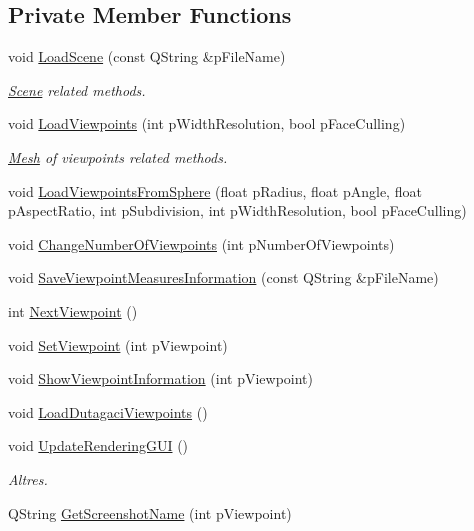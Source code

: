 \subsection*{Private Member Functions}
\begin{DoxyCompactItemize}
\item 
void \hyperlink{class_main_module_controller_a3df04dcc50ced684b43775eaf33cca4b}{Load\+Scene} (const Q\+String \&p\+File\+Name)
\begin{DoxyCompactList}\small\item\em \hyperlink{class_scene}{Scene} related methods. \end{DoxyCompactList}\item 
void \hyperlink{class_main_module_controller_aee272f3f6b07c5e42935cc9ab7dffaf4}{Load\+Viewpoints} (int p\+Width\+Resolution, bool p\+Face\+Culling)
\begin{DoxyCompactList}\small\item\em \hyperlink{class_mesh}{Mesh} of viewpoints related methods. \end{DoxyCompactList}\item 
void \hyperlink{class_main_module_controller_abab94220077c2502af1f7dd69ed3b641}{Load\+Viewpoints\+From\+Sphere} (float p\+Radius, float p\+Angle, float p\+Aspect\+Ratio, int p\+Subdivision, int p\+Width\+Resolution, bool p\+Face\+Culling)
\item 
void \hyperlink{class_main_module_controller_aa4f80f92133577a82b995ce70daa6dbb}{Change\+Number\+Of\+Viewpoints} (int p\+Number\+Of\+Viewpoints)
\item 
void \hyperlink{class_main_module_controller_a7cad7f8f7907c68a61b879df31aba82a}{Save\+Viewpoint\+Measures\+Information} (const Q\+String \&p\+File\+Name)
\item 
int \hyperlink{class_main_module_controller_ad49eb58b1523fcaac64787c4f2efdc7e}{Next\+Viewpoint} ()
\item 
void \hyperlink{class_main_module_controller_a495027c90637b59ed0219c2601f8b781}{Set\+Viewpoint} (int p\+Viewpoint)
\item 
void \hyperlink{class_main_module_controller_ac641d83b906a4d427b1726edd25f6bad}{Show\+Viewpoint\+Information} (int p\+Viewpoint)
\item 
void \hyperlink{class_main_module_controller_aa5aa72991a224cb72d718b21c3b1e90d}{Load\+Dutagaci\+Viewpoints} ()
\item 
void \hyperlink{class_main_module_controller_a4bd90331d111d7629b3a9d3c8c19706a}{Update\+Rendering\+G\+U\+I} ()
\begin{DoxyCompactList}\small\item\em Altres. \end{DoxyCompactList}\item 
Q\+String \hyperlink{class_main_module_controller_a1e28fd4e88775c92334bf10a0d6cfd04}{Get\+Screenshot\+Name} (int p\+Viewpoint)
\end{DoxyCompactItemize}
